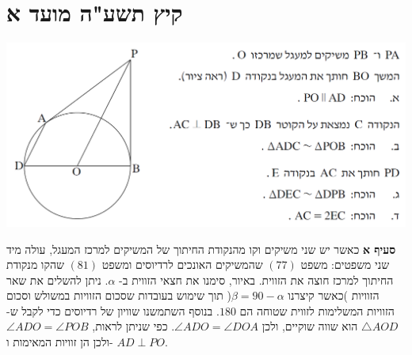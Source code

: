 \documentclass[12pt,a4paper]{article}
\begin{document}


\section*{קיץ תשע"ה מועד א}

\begin{center}
\includegraphics[width=\textwidth]{summer-2015a-4}
\end{center}

\textbf{סעיף א}
כאשר יש שני משיקים וקו מהנקודת החיתוך של המשיקים למרכז המעגל, עולה מיד שני משפטים: משפט
$(77)$
שהמשיקים האונכים לרדיוסים ומשפט
$(81)$
שהקו מנקודת החיתוך למרכז חוצה את הזווית. באיור, סימנו את חצאי הזווית ב-%
$\alpha$.
ניתן להשלים את שאר הזוויות )כאשר קיצרנו
$\beta = 90-\alpha$(
תוך שימוש בעובדות שסכום הזוויות במשולש וסכום הזוויות המשלימות לזווית שטוחה הם 
$180$.
בנוסף השתמשנו שוויון של רדיוסים כדי לקבל ש-%
$\triangle AOD$
הוא שווה שוקיים, ולכן
$\angle ADO=\angle DOA$.
כפי שניתן לראות,
$\angle ADO=\angle POB$
ולכן הן זוויות המאימות ו-%
$AD\perp PO$.
\end{document}

